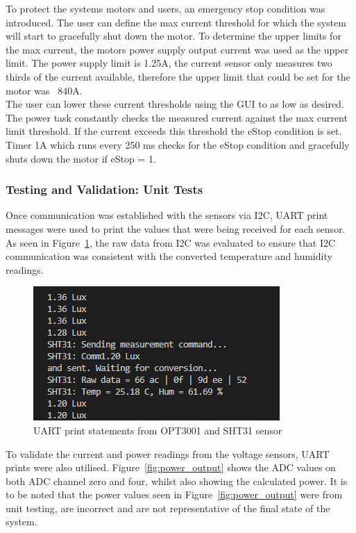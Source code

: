 \documentclass[a4paper, 11pt, titlepage]{article}
\begin{document}
To protect the systems motors and users, an emergency stop condition was introduced. The user can define the max current threshold for which the system will start to gracefully shut down the motor. To determine the upper limits for the max current, the motors power supply output current was used as the upper limit. The power supply limit is 1.25A, the current sensor only measures two thirds of the current available, therefore the upper limit that could be set for the motor was ~840A.\\

The user can lower these current thresholds using the GUI to as low as desired. The power task constantly checks the measured current against the max current limit threshold. If the current exceeds this threshold the eStop condition is set. Timer 1A which runs every 250 ms checks for the eStop condition and gracefully shuts down the motor if eStop = 1.\\
\subsubsection{Testing and Validation: Unit Tests}

Once communication was established with the sensors via I2C, UART print messages were used to print the values that were being received for each sensor. As seen in Figure~\ref{fig:sensor_output}, the raw data from I2C was evaluated to ensure that I2C communication was consistent with the converted temperature and humidity readings.


\begin{figure}[H]
    \centering
    \includegraphics[width=0.7\linewidth]{images/OPT3001_SHT31_OUTPUT.png}
    \caption{UART print statements from OPT3001 and SHT31 sensor}
    \label{fig:sensor_output}
\end{figure}

To validate the current and power readings from the voltage sensors, UART prints were also utilised. Figure~\ref{fig:power_output} shows the ADC values on both ADC channel zero and four, whilst also showing the calculated power. It is to be noted that the power values seen in Figure~\ref{fig:power_output} were from unit testing, are incorrect and are not representative of the final state of the system.
\end{document}
